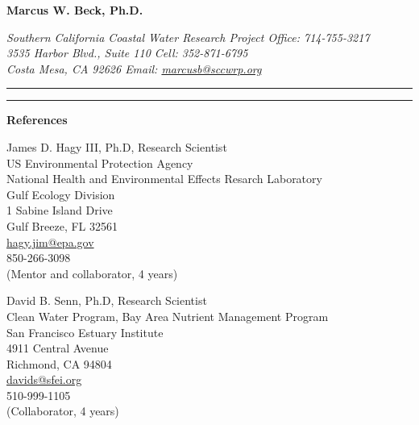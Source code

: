 \documentclass[letterpaper,12pt]{article}
\newcommand{\sectitle}[1]{\vspace{\baselineskip} \centerline{\large{{\bf #1}}}}
\begin{document}
\raggedright

\LARGE
\centerline{{\bf Marcus W. Beck, Ph.D.}}
\normalsize
\textit{Southern California Coastal Water Research Project \hfill Office: 714-755-3217 \\
3535 Harbor Blvd., Suite 110 \hfill Cell: 352-871-6795 \\
Costa Mesa, CA 92626 \hfill Email: \href{mailto:marcusb@sccwrp.org}{marcusb@sccwrp.org}}
\vspace{4pt}
\hrule
\vspace{2pt}
\hrule
\vspace{4pt}

\sectitle{References}


\centering
James D. Hagy III, Ph.D, Research Scientist  \\ 
US Environmental Protection Agency \\
National Health and Environmental Effects Resarch Laboratory \\
Gulf Ecology Division \\
1 Sabine Island Drive \\
Gulf Breeze, FL 32561 \\
\href{mailto:hagy.jim@epa.gov}{hagy.jim@epa.gov} \\
850-266-3098 \\
(Mentor and collaborator, 4 years) \\
\vspace{\baselineskip}

David B. Senn, Ph.D, Research Scientist  \\ 
Clean Water Program, Bay Area Nutrient Management Program \\
San Francisco Estuary Institute \\
4911 Central Avenue \\
Richmond, CA 94804 \\
\href{mailto:davids@sfei.org}{davids@sfei.org} \\
510-999-1105 \\
(Collaborator, 4 years) \\
\vspace{\baselineskip}
\end{document}
